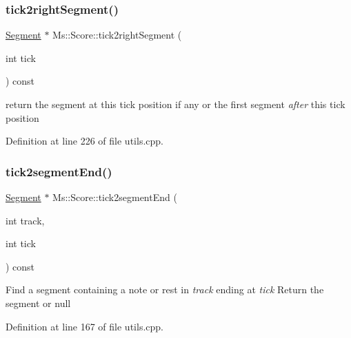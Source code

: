 \mbox{\label{class_ms_1_1_score_a1797883498364c2b08ec6648d9849f29}} 
\subsubsection{\texorpdfstring{tick2right\+Segment()}{tick2rightSegment()}}
{\footnotesize\ttfamily \hyperlink{class_ms_1_1_segment}{Segment} $\ast$ Ms\+::\+Score\+::tick2right\+Segment (\begin{DoxyParamCaption}\item[{int}]{tick }\end{DoxyParamCaption}) const}

return the segment at this tick position if any or the first segment {\itshape after} this tick position 

Definition at line 226 of file utils.\+cpp.

\mbox{\label{class_ms_1_1_score_a125c1e9940f71c2cb59e4d49df6a8244}} 
\subsubsection{\texorpdfstring{tick2segment\+End()}{tick2segmentEnd()}}
{\footnotesize\ttfamily \hyperlink{class_ms_1_1_segment}{Segment} $\ast$ Ms\+::\+Score\+::tick2segment\+End (\begin{DoxyParamCaption}\item[{int}]{track,  }\item[{int}]{tick }\end{DoxyParamCaption}) const}

Find a segment containing a note or rest in {\itshape track} ending at {\itshape tick} Return the segment or null 

Definition at line 167 of file utils.\+cpp.



